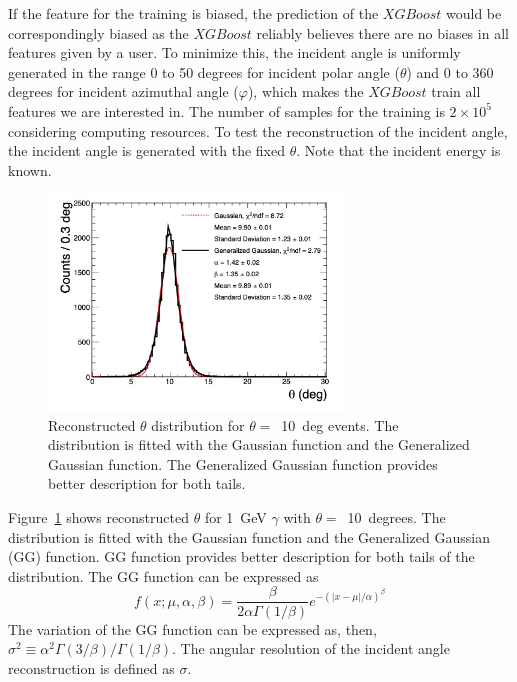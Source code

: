 \documentclass[jkps,preprint,fleqn,showpacs,showkeys]{revtex4}
\newcommand{\XGB}{XGBoost}
\begin{document}
If the feature for the training is biased, the prediction of the $\XGB$ would be correspondingly biased as the $\XGB$ reliably believes there are no biases in all features given by a user. To minimize this, the incident angle is uniformly generated in the range 0 to 50 degrees for incident polar angle ($\theta$) and 0 to 360 degrees for incident azimuthal angle ($\varphi$), which makes the $\XGB$ train all features we are interested in. The number of samples for the training is $2\times10^5$ considering computing resources. To test the reconstruction of the incident angle, the incident angle is generated with the fixed $\theta$. Note that the incident energy is known.

\begin{figure}[!hbt]
\includegraphics[width=0.7\textwidth]{figures/GG_fit.jpg}
\caption{ Reconstructed $\theta$ distribution for $\theta=$~10~deg events. The distribution is fitted with the Gaussian function and the Generalized Gaussian function. The Generalized Gaussian function provides better description for both tails.}
\label{fig:angle_10degree}
\end{figure}

Figure~\ref{fig:angle_10degree} shows reconstructed $\theta$ for 1~GeV $\gamma$ with $\theta=$~10~degrees. The distribution is fitted with the Gaussian function and the Generalized Gaussian (GG) function. GG function provides better description for both tails of the distribution. The GG function can be expressed as
\begin{equation} 
f(x; \mu, \alpha, \beta) = \frac{\beta}{2 \alpha \Gamma(1/\beta)}e^{-(|x-\mu|/\alpha)^\beta}
\end{equation}
The variation of the GG function can be expressed as, then, $\sigma^2 \equiv \alpha^2 \Gamma(3/\beta) / \Gamma(1/\beta)$. The angular resolution of the incident angle reconstruction is defined as $\sigma$.
\end{document}
